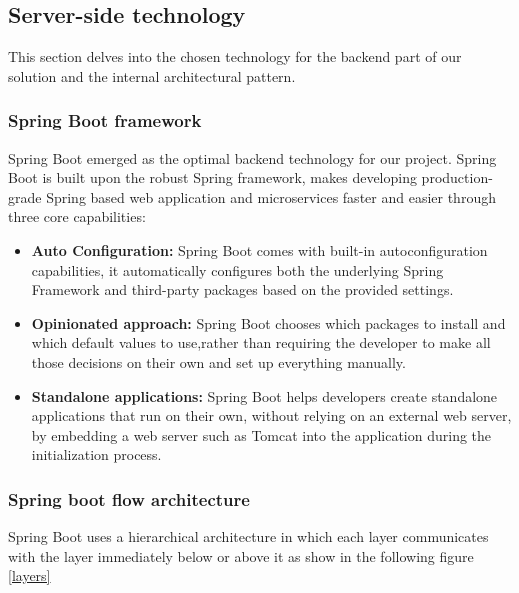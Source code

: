 
\subsection{Server-side technology}
This section delves into the chosen technology for the backend part of our solution and the
internal architectural pattern.

\subsubsection{Spring Boot framework}
Spring Boot emerged as the optimal backend technology for our project.
Spring Boot is built upon the robust Spring framework, makes developing production-grade Spring based
web application and microservices faster and easier through three core capabilities:

\begin{itemize}
      \item \textbf{Auto Configuration:} Spring Boot comes with built-in autoconfiguration capabilities,
            it automatically configures both the underlying Spring Framework and third-party packages based
            on the provided settings.
      \item \textbf{Opinionated approach:}  Spring Boot chooses which packages to install and which default
            values to use,rather than requiring the developer to make all those decisions on their own and set
            up everything manually.
      \item \textbf{Standalone applications:} Spring Boot helps developers create standalone applications
            that run on their own, without relying on an external web server, by embedding a web server such as
            Tomcat into the application during the initialization process.
\end{itemize}

\subsubsection{Spring boot flow architecture}
Spring Boot uses a hierarchical architecture in which each layer communicates with the layer immediately
below or above it as show in the following figure \ref{layers}

